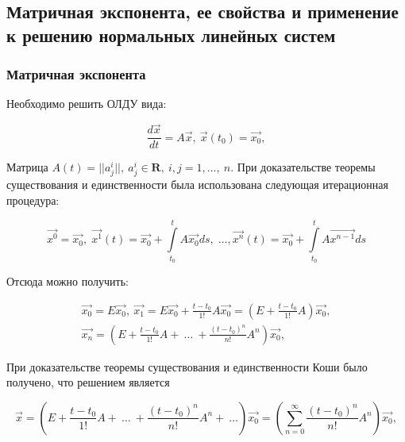 \subsection{Матричная экспонента, ее свойства и применение к решению нормальных линейных систем}

\subsubsection{Матричная экспонента}
Необходимо решить ОЛДУ вида:

\begin{equation}
  	\frac{d\overrightarrow{x}}{dt} = A\overrightarrow{x},\ \overrightarrow{x}(t_0) = \overrightarrow{x_0},
  	\label{Issue5_1}
\end{equation}

Матрица $A(t) = ||a_j^i||,\ a_j^i \in \mathbf{R},\ i, j = 1,\dots,\ n$. При доказательстве теоремы существования и единственности была использована следующая итерационная процедура:

\begin{equation*}
	\overrightarrow{x^{0}} = \overrightarrow{x_{0}}, \; \overrightarrow{x^{1}}(t) = \overrightarrow{x_{0}} + \int \limits_{t_0}^{t} A \overrightarrow{x_{0}} ds, \; \dots, \overrightarrow{x^{n}}(t) = \overrightarrow{x_{0}} + \int \limits_{t_0}^{t} A \overrightarrow{x^{n - 1}} ds
\end{equation*}

Отсюда можно получить:

\begin{equation*}
\begin{gathered}
         \overrightarrow{x_{0}} = E\overrightarrow{x_0},\ \overrightarrow{x_1} = E\overrightarrow{x_0} + \frac{t-t_0}{1!}A\overrightarrow{x_0} = \left(E + \frac{t-t_0}{1!}A\right) \overrightarrow{x_0}, \\  
         \overrightarrow{x_n} = \left(E + \frac{t-t_0}{1!}A +\ \dots\ + \frac{(t-t_0)^n}{n!}A^n\right)\overrightarrow{x_0},	 
\end{gathered}
\end{equation*}

При доказательстве теоремы существования и единственности Коши было получено, что решением является

\begin{equation*}
   	\overrightarrow{x} = \left(E + \frac{t-t_0}{1!}A +\ \dots\ + \frac{(t-t_0)^n}{n!}A^n+\ \dots \right)\overrightarrow{x_0} = \left(\sum\limits_{n = 0}^{\infty} \frac{(t-t_0)^n}{n!}A^n\right)\overrightarrow{x_0},	 
\end{equation*}

